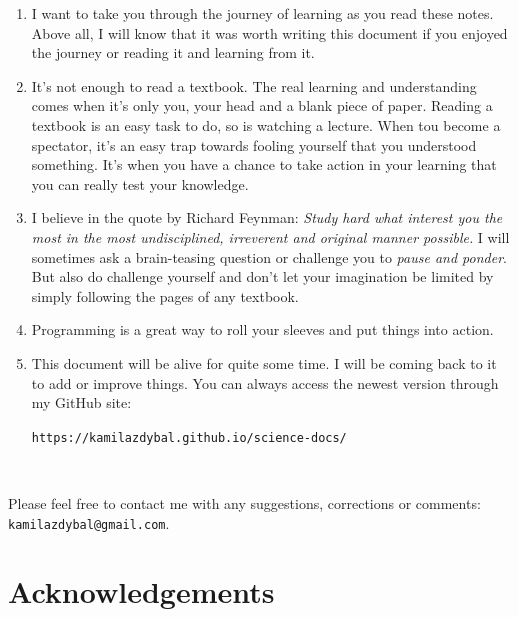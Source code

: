 \documentclass[10pt]{report}
\begin{document}
\begin{enumerate}
\item I want to take you through the journey of learning as you read these notes. Above all, I will know that it was worth writing this document if you enjoyed the journey or reading it and learning from it.
\item It's not enough to read a textbook. The real learning and understanding comes when it's only you, your head and a blank piece of paper. Reading a textbook is an easy task to do, so is watching a lecture. When tou become a spectator, it's an easy trap towards fooling yourself that you understood something. It's when you have a chance to take action in your learning that you can really test your knowledge.
\item I believe in the quote by Richard Feynman: \textit{Study hard what interest you the most in the most undisciplined, irreverent and original manner possible.} I will sometimes ask a brain-teasing question or challenge you to \textit{pause and ponder}. But also do challenge yourself and don't let your imagination be limited by simply following the pages of any textbook.
\item Programming is a great way to roll your sleeves and put things into action.
\item This document will be alive for quite some time. I will be coming back to it to add or improve things. You can always access the newest version through my GitHub site:

\verb|https://kamilazdybal.github.io/science-docs/|
\end{enumerate}

\,\,

Please feel free to contact me with any suggestions, corrections or comments: \verb|kamilazdybal@gmail.com|.


\newpage
\chapter*{Acknowledgements}
\thispagestyle{empty}

{\fontsize{12}{12}}

\vspace*{0.5cm}

{\fontsize{12}{12}}

\vspace*{0.5cm}
\end{document}
